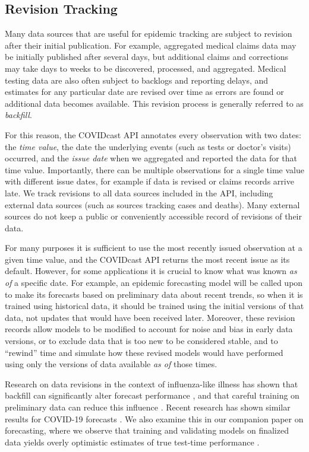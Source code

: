 \documentclass[9pt,twocolumn,twoside,lineno]{pnas-new}
\begin{document}
\subsection{Revision Tracking}
\label{subsec:revision_tracking}

Many data sources that are useful for epidemic tracking are subject to revision
after their initial publication. For example, aggregated medical claims data may
be initially published after several days, but additional claims and corrections
may take days to weeks to be discovered, processed, and aggregated. Medical
testing data are also often subject to backlogs and reporting delays, and
estimates for any particular date are revised over time as errors are found or
additional data becomes available. This revision process is generally referred
to as \textit{backfill}.

For this reason, the COVIDcast API annotates every observation with two dates:
the \textit{time value}, the date the underlying events (such as tests or
doctor's visits) occurred, and the \textit{issue date} when we aggregated and
reported the data for that time value. Importantly, there can be multiple
observations for a single time value with different issue dates, for example if
data is revised or claims records arrive late. We track revisions to all data
sources included in the API, including external data sources (such as sources
tracking cases and deaths). Many external sources do not keep a public or
conveniently accessible record of revisions of their data.

For many purposes it is sufficient to use the most recently issued observation
at a given time value, and the COVIDcast API returns the most recent issue as
its default. However, for some applications it is crucial to know what was known
\textit{as of} a specific date. For example, an epidemic forecasting model will
be called upon to make its forecasts based on preliminary data about recent
trends, so when it is trained using historical data, it should be trained using
the initial versions of that data, not updates that would have been received
later. Moreover, these revision records allow models to be modified to account
for noise and bias in early data versions, or to exclude data that is too new to
be considered stable, and to ``rewind'' time and simulate how these revised
models would have performed using only the versions of data available \textit{as
  of} those times.

Research on data revisions in the context of influenza-like illness has shown
that backfill can significantly alter forecast performance \cite{Brooks:2018,
  Reich:2019}, and that careful training on preliminary data can reduce this
influence \cite{Brooks:2020}. Recent research has shown similar results for
COVID-19 forecasts \cite{Kamarthi:2021}. We also examine this in our companion
paper on forecasting, where we observe that training and validating models on
finalized data yields overly optimistic estimates of true test-time
performance \cite{McDonald:2021}.
\end{document}
